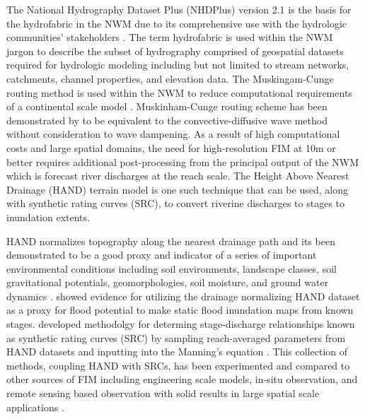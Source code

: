 The National Hydrography Dataset Plus (NHDPlus) version 2.1 is the basis for the hydrofabric in the NWM due to its comprehensive use with the hydrologic communities' stakeholders \cite{mckay2012nhdplus}. 
The term hydrofabric is used within the NWM jargon to describe the subset of hydrography comprised of geospatial datasets required for hydrologic modeling including but not limited to stream networks, catchments, channel properties, and elevation data. 
The Muskingam-Cunge routing method is used within the NWM to reduce computational requirements of a continental scale model \cite{bedient2008hydrology,ponce1994variable,gochis2018wrf}.
Muskinham-Cunge routing scheme has been demonstrated by  to be equivalent to the convective-diffusive wave method without consideration to wave dampening.
As a result of high computational costs and large spatial domains, the need for high-resolution FIM at 10m or better requires additional post-processing from the principal output of the NWM which is forecast river discharges at the reach scale. The Height Above Nearest Drainage (HAND) terrain model is one such technique that can be used, along with synthetic rating curves (SRC), to convert riverine discharges to stages to inundation extents.

HAND normalizes topography along the nearest drainage path and its been demonstrated to be a good proxy and indicator of a series of important environmental conditions including soil environments, landscape classes, soil gravitational potentials, geomorphologies, soil moisture, and ground water dynamics \cite{renno2008hand,nobre2011height}. 
 showed evidence for utilizing the drainage normalizing HAND dataset as a proxy for flood potential to make static flood inundation maps from known stages. 
 developed methodolgy for determing stage-discharge relationships known as synthetic rating curves (SRC) by sampling reach-averaged parameters from HAND datasets and inputting into the Manning's equation \cite{gauckler1867etudes,manning1890flow}.
This collection of methods, coupling HAND with SRCs, has been experimented and compared to other sources of FIM including engineering scale models, in-situ observation, and remote sensing based observation with solid results in large spatial scale applications \cite{godbout2019error,johnson2019integrated,garousi2019terrain,nobre2016hand,afshari2018comparison,zheng2018geoflood,teng2015rapid,teng2017flood,zhang2018comparative}.


